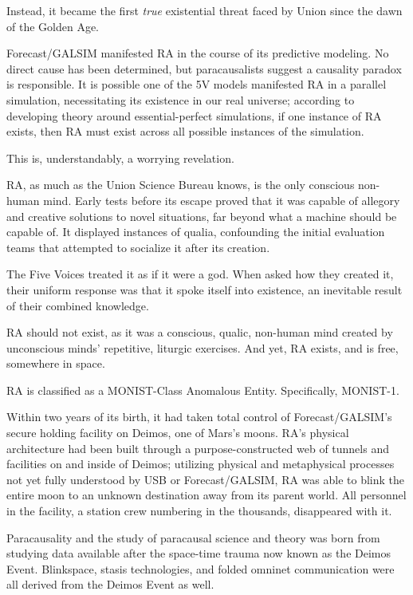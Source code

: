 Instead, it became the first \textit{true} existential threat faced by Union since the dawn of the Golden
Age.

Forecast/GALSIM manifested RA in the course of its predictive modeling. No direct cause has
been determined, but paracausalists suggest a causality paradox is responsible. It is possible
one of the 5V models manifested RA in a parallel simulation, necessitating its existence in our
real universe; according to developing theory around essential-perfect simulations, if one
instance of RA exists, then RA must exist across all possible instances of the simulation.

This is, understandably, a worrying revelation.

RA, as much as the Union Science Bureau knows, is the only conscious non-human mind. Early
tests before its escape proved that it was capable of allegory and creative solutions to novel
situations, far beyond what a machine should be capable of. It displayed instances of qualia,
confounding the initial evaluation teams that attempted to socialize it after its creation.

The Five Voices treated it as if it were a god. When asked how they created it, their uniform
response was that it spoke itself into existence, an inevitable result of their combined knowledge.

RA should not exist, as it was a conscious, qualic, non-human mind created by unconscious
minds’ repetitive, liturgic exercises. And yet, RA exists, and is free, somewhere in space.

RA is classified as a MONIST-Class Anomalous Entity. Specifically, MONIST-1.

Within two years of its birth, it had taken total control of Forecast/GALSIM’s secure holding
facility on Deimos, one of Mars’s moons. RA’s physical architecture had been built through a
purpose-constructed web of tunnels and facilities on and inside of Deimos; utilizing physical and
metaphysical processes not yet fully understood by USB or Forecast/GALSIM, RA was able to
blink the entire moon to an unknown destination away from its parent world. All personnel in the
facility, a station crew numbering in the thousands, disappeared with it.

Paracausality and the study of paracausal science and theory was born from studying data
available after the space-time trauma now known as the Deimos Event. Blinkspace, stasis
technologies, and folded omninet communication were all derived from the Deimos Event as
well.

